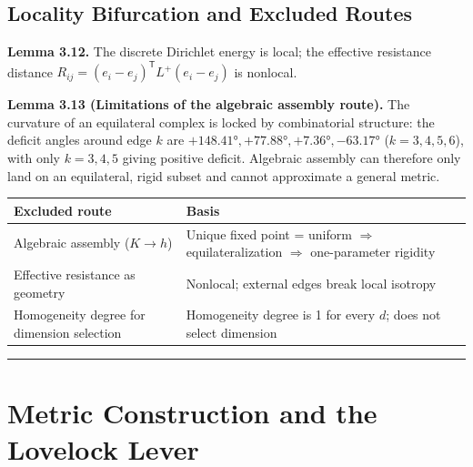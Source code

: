 \documentclass[
  11pt,
]{article}
\newcounter{none} %
\begin{document}
\subsection{Locality Bifurcation and Excluded
Routes}\label{locality-bifurcation-and-excluded-routes}

\textbf{Lemma 3.12.} The discrete Dirichlet energy is local; the
effective resistance distance
\(R_{ij}=(e_i-e_j)^{\mathsf T}L^+(e_i-e_j)\) is nonlocal.

\textbf{Lemma 3.13 (Limitations of the algebraic assembly route).} The
curvature of an equilateral complex is locked by combinatorial
structure: the deficit angles around edge \(k\) are
\(+148.41°,+77.88°,+7.36°,-63.17°\) (\(k=3,4,5,6\)), with only
\(k=3,4,5\) giving positive deficit. Algebraic assembly can therefore
only land on an equilateral, rigid subset and cannot approximate a
general metric.

{\def\LTcaptype{none} %
\begin{longtable}[]{@{}
  >{\raggedright\arraybackslash}p{}
  >{\raggedright\arraybackslash}p{}@{}}
\toprule\noalign{}
\begin{minipage}[b]{\linewidth}\raggedright
Excluded route
\end{minipage} & \begin{minipage}[b]{\linewidth}\raggedright
Basis
\end{minipage} \\
\midrule\noalign{}
\endhead
\bottomrule\noalign{}
\endlastfoot
Algebraic assembly (\(K\to h\)) & Unique fixed point = uniform
\(\Rightarrow\) equilateralization \(\Rightarrow\) one-parameter
rigidity \\
Effective resistance as geometry & Nonlocal; external edges break local
isotropy \\
Homogeneity degree for dimension selection & Homogeneity degree is 1 for
every \(d\); does not select dimension \\
\end{longtable}
}

\begin{center}\rule{0.5\linewidth}{0.5pt}\end{center}

\section{Metric Construction and the Lovelock
Lever}\label{metric-construction-and-the-lovelock-lever}
\end{document}
